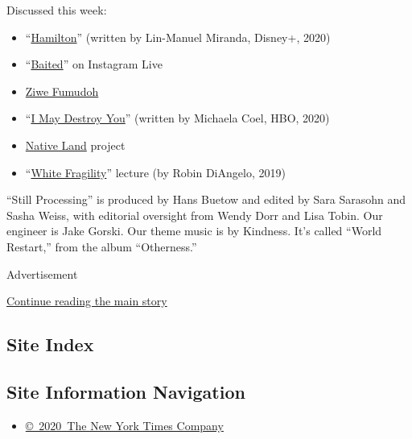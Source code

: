 Discussed this week:

\begin{itemize}
\item
  ``\href{https://disneyplusoriginals.disney.com/movie/hamilton}{Hamilton}''
  (written by Lin-Manuel Miranda, Disney+, 2020)
\item
  ``\href{https://www.instagram.com/ziwef/channel/?hl=en}{Baited}'' on
  Instagram Live
\item
  \href{https://ziwefumudoh.com/work}{Ziwe Fumudoh}
\item
  ``\href{https://www.hbo.com/i-may-destroy-you}{I May Destroy You}''
  (written by Michaela Coel, HBO, 2020)
\item
  \href{https://native-land.ca/}{Native Land} project
\item
  ``\href{https://www.youtube.com/watch?v=HrOFpaB-PQI}{White
  Fragility}'' lecture (by Robin DiAngelo, 2019)
\end{itemize}

``Still Processing'' is produced by Hans Buetow and edited by Sara
Sarasohn and Sasha Weiss, with editorial oversight from Wendy Dorr and
Lisa Tobin. Our engineer is Jake Gorski. Our theme music is by Kindness.
It's called ``World Restart,'' from the album ``Otherness.''

Advertisement

\protect\hyperlink{after-bottom}{Continue reading the main story}

\hypertarget{site-index}{%
\subsection{Site Index}\label{site-index}}

\hypertarget{site-information-navigation}{%
\subsection{Site Information
Navigation}\label{site-information-navigation}}

\begin{itemize}
\tightlist
\item
  \href{https://help.nytimes.com/hc/en-us/articles/115014792127-Copyright-notice}{©~2020~The
  New York Times Company}
\end{itemize}

